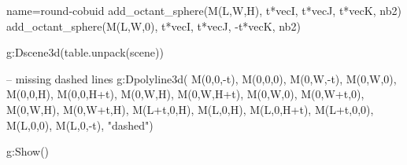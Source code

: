 \documentclass{standalone}
\begin{document}
\begin{luadraw}{name=round-cobuid}
add_octant_sphere(M(L,W,H), t*vecI, t*vecJ, t*vecK, nb2)
add_octant_sphere(M(L,W,0), t*vecI, t*vecJ, -t*vecK, nb2)

g:Dscene3d(table.unpack(scene))

-- missing dashed lines
g:Dpolyline3d({
    {M(0,0,-t), M(0,0,0)}, {M(0,W,-t), M(0,W,0)}, {M(0,0,H), M(0,0,H+t)}, {M(0,W,H), M(0,W,H+t)},
    {M(0,W,0), M(0,W+t,0)}, {M(0,W,H), M(0,W+t,H)}, {M(L+t,0,H), M(L,0,H), M(L,0,H+t)},
    {M(L+t,0,0), M(L,0,0), M(L,0,-t)}}, "dashed")

g:Show()
\end{luadraw}
\end{document}

